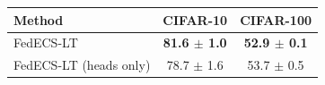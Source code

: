 \begin{tabular}{lcc}
\toprule
Method & CIFAR-10 & CIFAR-100\\
\midrule
FedECS-LT & \textbf{81.6 $\pm$ 1.0} & \textbf{52.9 $\pm$ 0.1}\\
FedECS-LT (heads only) & 78.7 $\pm$ 1.6 & 53.7 $\pm$ 0.5\\
\bottomrule
\end{tabular}
